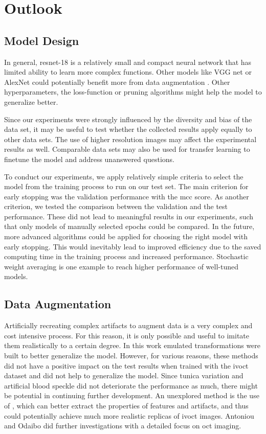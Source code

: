 
\chapter{Outlook}

\section{Model Design}

In general, \acrshort{resnet}-18 is a relatively small and compact neural network that has limited ability to learn more complex functions. Other models like VGG net or AlexNet could potentially benefit more from data augmentation \cite{Gessert.2019, Majib.2021, WeiYu.2016}. Other hyperparameters, the loss-function or pruning algorithms might help the model to generalize better.

Since our experiments were strongly influenced by the diversity and bias of the data set, it may be useful to test whether the collected results apply equally to other data sets. The use of higher resolution images may affect the experimental results as well. Comparable data sets may also be used for transfer learning to finetune the model and address unanswered questions.

To conduct our experiments, we apply relatively simple criteria to select the model from the training process to run on our test set. The main criterion for early stopping was the validation performance with the \acrshort{mcc} score. As another criterion, we tested the comparison between the validation and the test performance. These did not lead to meaningful results in our experiments, such that only models of manually selected epochs could be compared. In the future, more advanced algorithms could be applied for choosing the right model with early stopping. This would inevitably lead to improved efficiency due to the saved computing time in the training process and increased performance. Stochastic weight averaging is one example to reach higher performance of well-tuned models.

\section{Data Augmentation}

Artificially recreating complex artifacts to augment data is a very complex and cost intensive process. For this reason, it is only possible and useful to imitate them realistically to a certain degree. In this work emulated transformations were built to better generalize the model. However, for various reasons, these methods did not have a positive impact on the test results when trained with the \acrshort{ivoct} dataset and did not help to generalize the model. Since tunica variation and artificial blood speckle did not deteriorate the performance as much, there might be potential in continuing further development. An unexplored method is the use of , which can better extract the properties of features and artifacts, and thus could potentially achieve much more realistic replicas of \acrshort{ivoct} images. Antoniou \cite{Antoniou.11122017} and Odaibo \cite{Odaibo.2182019} did further investigations with a detailed focus on \acrshort{oct} imaging.

